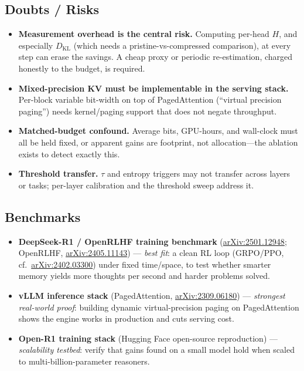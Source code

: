 \documentclass[11pt]{article}
\newcommand{\arxiv}[1]{\href{https://arxiv.org/abs/#1}{arXiv:#1}}
\begin{document}
\subsection{Doubts / Risks}
\begin{itemize}[leftmargin=1.2em,itemsep=2pt]
  \item \textbf{Measurement overhead is the central risk.} Computing per-head $H$, and
    especially $D_{\mathrm{KL}}$ (which needs a pristine-vs-compressed comparison), at
    every step can erase the savings. A cheap proxy or periodic re-estimation, charged
    honestly to the budget, is required.
  \item \textbf{Mixed-precision KV must be implementable in the serving stack.}
    Per-block variable bit-width on top of PagedAttention (``virtual precision paging'')
    needs kernel/paging support that does not negate throughput.
  \item \textbf{Matched-budget confound.} Average bits, GPU-hours, and wall-clock must all
    be held fixed, or apparent gains are footprint, not allocation---the ablation exists
    to detect exactly this.
  \item \textbf{Threshold transfer.} $\tau$ and entropy triggers may not transfer across
    layers or tasks; per-layer calibration and the threshold sweep address it.
\end{itemize}

\subsection{Benchmarks}
\begin{itemize}[leftmargin=1.2em,itemsep=3pt]
  \item \textbf{DeepSeek-R1 / OpenRLHF training benchmark} (\arxiv{2501.12948};
    OpenRLHF, \arxiv{2405.11143}) --- \emph{best fit}: a clean RL loop (GRPO/PPO, cf.\
    \arxiv{2402.03300}) under fixed time/space, to test whether smarter memory yields more
    thoughts per second and harder problems solved.
  \item \textbf{vLLM inference stack} (PagedAttention, \arxiv{2309.06180}) ---
    \emph{strongest real-world proof}: building dynamic virtual-precision paging on
    PagedAttention shows the engine works in production and cuts serving cost.
  \item \textbf{Open-R1 training stack} (Hugging Face open-source reproduction) ---
    \emph{scalability testbed}: verify that gains found on a small model hold when scaled
    to multi-billion-parameter reasoners.
\end{itemize}
\end{document}
